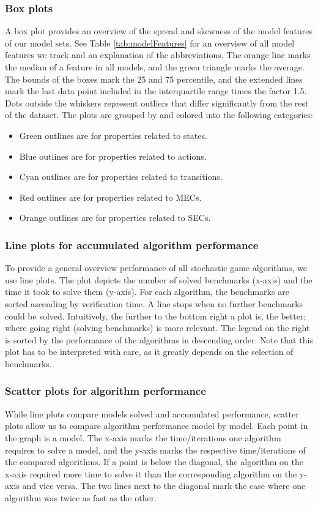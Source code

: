 \subsubsection*{Box plots} \label{plot:boxplot}
A box plot provides an overview of the spread and skewness of the model features of our model sets.
See Table \ref{tab:modelFeatures} for an overview of all model features we track and an explanation of the abbreviations.
The orange line marks the median of a feature in all models, and the green triangle marks the
average. The bounds of the boxes mark the 25 and 75 percentile, and the extended lines 
mark the last data point included in the interquartile range times the factor 1.5. Dots outside the whiskers represent
outliers that differ significantly from the rest of the dataset.
The plots are grouped by and colored into the following categories:
\begin{itemize}
    \item Green outlines are for properties related to states. 
    \item Blue outlines are for properties related to actions. 
    \item Cyan outlines are for properties related to transitions.
    \item Red outlines are for properties related to MECs.
    \item Orange outlines are for properties related to SECs. 
\end{itemize}

\subsubsection*{Line plots for accumulated algorithm performance} \label{plot:starplot}
To provide a general overview performance of all stochastic game algorithms, we use line plots.
The plot depicts the number of solved benchmarks (x-axis) and the time it took to solve them (y-axis). 
For each algorithm, the benchmarks are sorted ascending by verification time. A line stops when no further benchmarks could be solved.
Intuitively, the further to the bottom right a plot is, the better; where going right (solving benchmarks) is more relevant.
The legend on the right is sorted by the performance of the algorithms in descending order.
Note that this plot has to be interpreted with care, as it greatly depends on the selection of benchmarks.

\subsubsection*{Scatter plots for algorithm performance} \label{plot:performanceScatter}
While line plots compare models solved and accumulated performance, scatter plots allow us to compare algorithm performance model by model.
Each point in the graph is a model. The x-axis marks the time/iterations one algorithm requires to solve a model, and the y-axis marks the respective time/iterations of the compared algorithms.
If a point is below the diagonal, the algorithm on the x-axis required more time to solve it than the corresponding algorithm on the y-axis and vice versa.
The two lines next to the diagonal mark the case where one algorithm was twice as fast as the other.

